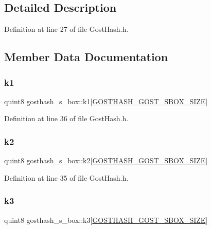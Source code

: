 \subsection{Detailed Description}


Definition at line 27 of file Gost\+Hash.\+h.



\subsection{Member Data Documentation}
\mbox{\label{structgosthash__s__box_a4aee6188ea7631d2634af63e1f5e4afd}} 
\subsubsection{\texorpdfstring{k1}{k1}}
{\footnotesize\ttfamily quint8 gosthash\+\_\+s\+\_\+box\+::k1\mbox{[}\hyperlink{_gost_hash_8h_af1180f1c3243bbce8ea02985c5f44bfe}{G\+O\+S\+T\+H\+A\+S\+H\+\_\+\+G\+O\+S\+T\+\_\+\+S\+B\+O\+X\+\_\+\+S\+I\+ZE}\mbox{]}}



Definition at line 36 of file Gost\+Hash.\+h.

\mbox{\label{structgosthash__s__box_aa943d4e5af73f7e2d32354659baea32d}} 
\subsubsection{\texorpdfstring{k2}{k2}}
{\footnotesize\ttfamily quint8 gosthash\+\_\+s\+\_\+box\+::k2\mbox{[}\hyperlink{_gost_hash_8h_af1180f1c3243bbce8ea02985c5f44bfe}{G\+O\+S\+T\+H\+A\+S\+H\+\_\+\+G\+O\+S\+T\+\_\+\+S\+B\+O\+X\+\_\+\+S\+I\+ZE}\mbox{]}}



Definition at line 35 of file Gost\+Hash.\+h.

\mbox{\label{structgosthash__s__box_ad86621e37938b50e69fb7afad9a57853}} 
\subsubsection{\texorpdfstring{k3}{k3}}
{\footnotesize\ttfamily quint8 gosthash\+\_\+s\+\_\+box\+::k3\mbox{[}\hyperlink{_gost_hash_8h_af1180f1c3243bbce8ea02985c5f44bfe}{G\+O\+S\+T\+H\+A\+S\+H\+\_\+\+G\+O\+S\+T\+\_\+\+S\+B\+O\+X\+\_\+\+S\+I\+ZE}\mbox{]}}



